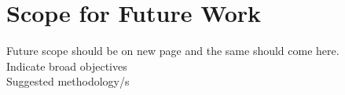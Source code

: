 \section{Scope for Future Work}
Future scope should be on new page and the same should come here.\\
 Indicate broad objectives\\
Suggested methodology/s\\



	
	






